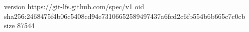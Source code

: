 version https://git-lfs.github.com/spec/v1
oid sha256:2468475f4b06c5408cd94e73106652589497437a6fcd2c6fb554b6b665c7c0cb
size 87544
